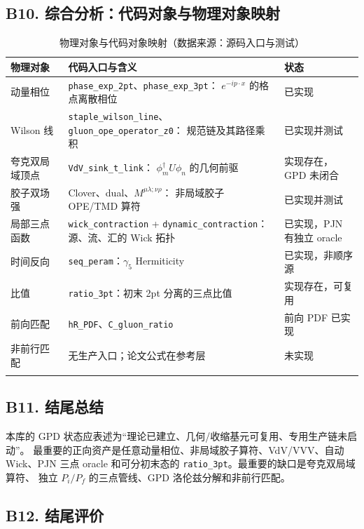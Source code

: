 \documentclass[UTF8]{ctexart}
\begin{document}
\subsection{B10. 综合分析：代码对象与物理对象映射}

\begin{xltabular}{\textwidth}{p{3.8cm}Xp{2.4cm}}
\toprule
\textcolor{struct}{物理对象} & 代码入口与含义 & 状态 \\
\midrule
\endhead
动量相位 & \texttt{phase\_exp\_2pt}、\texttt{phase\_exp\_3pt}：
$e^{-ip\cdot x}$ 的格点离散相位 & 已实现 \\
Wilson 线 & \texttt{staple\_wilson\_line}、\texttt{gluon\_ope\_operator\_z0}：
规范链及其路径乘积 & 已实现并测试 \\
夸克双局域顶点 & \texttt{VdV\_sink\_t\_link}：
$\phi_m^\dagger U\phi_n$ 的几何前驱 & 实现存在，GPD 未闭合 \\
胶子双场强 & Clover、dual、$M^{\mu\lambda;\nu\rho}$：
非局域胶子 OPE/TMD 算符 & 已实现并测试 \\
局部三点函数 & \texttt{wick\_contraction} + \texttt{dynamic\_contraction}：
源、流、汇的 Wick 拓扑 & 已实现，PJN 有独立 oracle \\
时间反向 & \texttt{seq\_peram}：$\gamma_5$ Hermiticity & 已实现，非顺序源 \\
比值 & \texttt{ratio\_3pt}：初末 2pt 分离的三点比值 & 实现存在，可复用 \\
前向匹配 & \texttt{hR\_PDF}、\texttt{C\_gluon\_ratio} & 前向 PDF 已实现 \\
非前行匹配 & 无生产入口；论文公式在参考层 & 未实现 \\
\bottomrule
\caption{物理对象与代码对象映射（数据来源：源码入口与测试）}
\end{xltabular}

\subsection{B11. 结尾总结}

\begin{conclbox}
本库的 GPD 状态应表述为“理论已建立、几何/收缩基元可复用、专用生产链未启动”。
最重要的正向资产是任意动量相位、非局域胶子算符、VdV/VVV、自动 Wick、PJN 三点
oracle 和可分初末态的 \texttt{ratio\_3pt}。最重要的缺口是夸克双局域算符、
独立 $P_i/P_f$ 的三点管线、GPD 洛伦兹分解和非前行匹配。
\end{conclbox}

\subsection{B12. 结尾评价}
\end{document}
